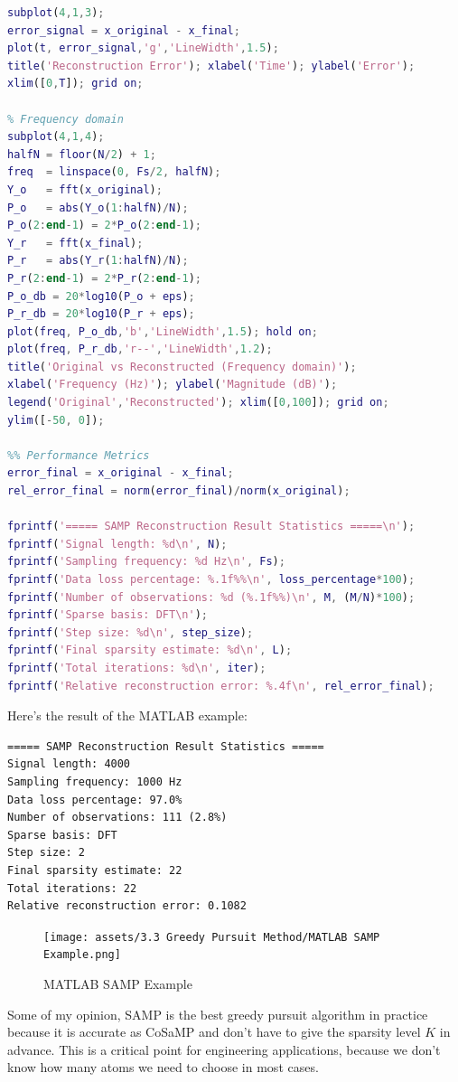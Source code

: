 \documentclass[12pt]{ctexart}
\begin{document}
\begin{lstlisting}[language=Matlab]
% Reconstruction error
subplot(4,1,3);
error_signal = x_original - x_final;
plot(t, error_signal,'g','LineWidth',1.5);
title('Reconstruction Error'); xlabel('Time'); ylabel('Error');
xlim([0,T]); grid on;

% Frequency domain
subplot(4,1,4);
halfN = floor(N/2) + 1;
freq  = linspace(0, Fs/2, halfN);
Y_o   = fft(x_original);
P_o   = abs(Y_o(1:halfN)/N);
P_o(2:end-1) = 2*P_o(2:end-1);
Y_r   = fft(x_final);
P_r   = abs(Y_r(1:halfN)/N);
P_r(2:end-1) = 2*P_r(2:end-1);
P_o_db = 20*log10(P_o + eps);
P_r_db = 20*log10(P_r + eps);
plot(freq, P_o_db,'b','LineWidth',1.5); hold on;
plot(freq, P_r_db,'r--','LineWidth',1.2);
title('Original vs Reconstructed (Frequency domain)');
xlabel('Frequency (Hz)'); ylabel('Magnitude (dB)');
legend('Original','Reconstructed'); xlim([0,100]); grid on;
ylim([-50, 0]);

%% Performance Metrics
error_final = x_original - x_final;
rel_error_final = norm(error_final)/norm(x_original);

fprintf('===== SAMP Reconstruction Result Statistics =====\n');
fprintf('Signal length: %d\n', N);
fprintf('Sampling frequency: %d Hz\n', Fs);
fprintf('Data loss percentage: %.1f%%\n', loss_percentage*100);
fprintf('Number of observations: %d (%.1f%%)\n', M, (M/N)*100);
fprintf('Sparse basis: DFT\n');
fprintf('Step size: %d\n', step_size);
fprintf('Final sparsity estimate: %d\n', L);
fprintf('Total iterations: %d\n', iter);
fprintf('Relative reconstruction error: %.4f\n', rel_error_final);
\end{lstlisting}

Here's the result of the MATLAB example:

\begin{verbatim}
===== SAMP Reconstruction Result Statistics =====
Signal length: 4000
Sampling frequency: 1000 Hz
Data loss percentage: 97.0%
Number of observations: 111 (2.8%)
Sparse basis: DFT
Step size: 2
Final sparsity estimate: 22
Total iterations: 22
Relative reconstruction error: 0.1082
\end{verbatim}

\begin{figure}[H]
  \centering
  \texttt{[image: assets/3.3 Greedy Pursuit Method/MATLAB SAMP
  Example.png]}
  \caption{MATLAB SAMP Example}
\end{figure}

Some of my opinion, SAMP is the best greedy pursuit algorithm in practice because it
is accurate as CoSaMP and don't have to give the sparsity level $K$ in advance. This
is a critical point for engineering applications, because we don't know how many
atoms we need to choose in most cases.
\end{document}
